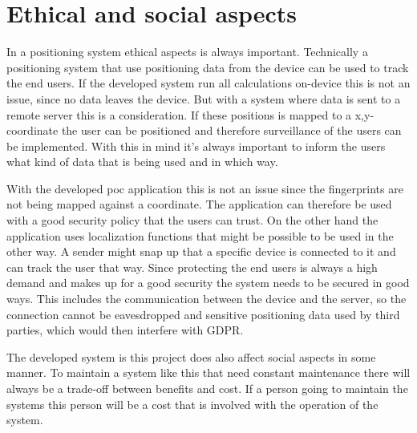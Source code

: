 





\section{Ethical and social aspects}\label{sec:discussionAspects}
In a positioning system ethical aspects is always important.
Technically a positioning system that use positioning data from the device can be used to track the end users.
If the developed system run all calculations on-device this is not an issue, since no data leaves the device.
But with a system where data is sent to a remote server this is a consideration.
If these positions is mapped to a x,y-coordinate the user can be positioned and therefore surveillance of the users can be implemented.
With this in mind it's always important to inform the users what kind of data that is being used and in which way.

\bigskip

With the developed \acrshort{poc} application this is not an issue since the fingerprints are not being mapped against a coordinate.
The application can therefore be used with a good security policy that the users can trust.
On the other hand the application uses localization functions that might be possible to be used in the other way.
A sender might snap up that a specific device is connected to it and can track the user that way.
Since protecting the end users is always a high demand and makes up for a good security the system needs to be secured in good ways.
This includes the communication between the device and the server, so the connection cannot be eavesdropped and sensitive positioning data used by third parties, which would then interfere with GDPR.

\bigskip

The developed system is this project does also affect social aspects in some manner.
To maintain a system like this that need constant maintenance there will always be a trade-off between benefits and cost.
If a person going to maintain the systems this person will be a cost that is involved with the operation of the system.

